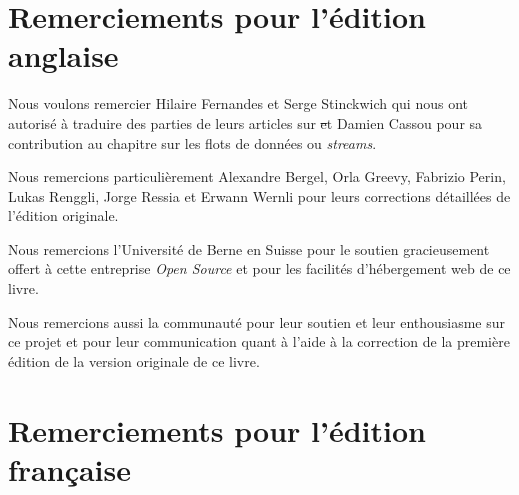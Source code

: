 \documentclass[a4paper,10pt,twoside]{book}
\begin{document}



\section*{Remerciements pour l'édition anglaise}


Nous voulons remercier Hilaire Fernandes et Serge Stinckwich qui nous
ont autorisé à traduire des parties de leurs articles sur \st et
Damien Cassou pour sa contribution au chapitre sur les flots de
données ou \emph{streams}.

Nous remercions particulièrement Alexandre Bergel, Orla Greevy,
Fabrizio Perin, Lukas Renggli, Jorge Ressia et Erwann Wernli pour leurs
corrections détaillées %
de l'édition originale. %

Nous remercions l'Université de Berne en Suisse pour le soutien
gracieusement offert à cette entreprise \emph{Open Source} et pour
les facilités d'hébergement web de ce livre.

Nous remercions aussi la communauté \squeak pour leur soutien et leur
enthousiasme sur ce projet et pour leur communication quant à l'aide à
la correction de la première édition de la version originale %
de ce livre. %

\section*{Remerciements pour l'édition française}
\end{document}
